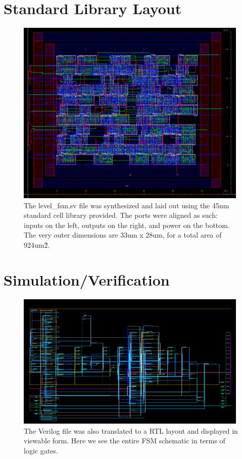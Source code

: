 \documentclass[11pt]{article}
\begin{document}
\section{Standard Library Layout}

\begin{figure}[H]
    \centering
\includegraphics[width=0.99\textwidth]{layout2.png}
    \caption{The level\_fsm.sv file was synthesized and laid out using the 45nm standard cell library provided. The ports were aligned as such: inputs on the left, outputs on the right, and power on the bottom. The very outer dimensions are 33um x 28um, for a total area of 924um\^2.}
\end{figure}


\section{Simulation/Verification}

\begin{figure}[H]
    \centering
\includegraphics[width=0.99\textwidth]{schem3.png}
    \caption{The Verilog file was also translated to a RTL layout and displayed in viewable form. Here we see the entire FSM schematic in terms of logic gates.}
\end{figure}
\end{document}
